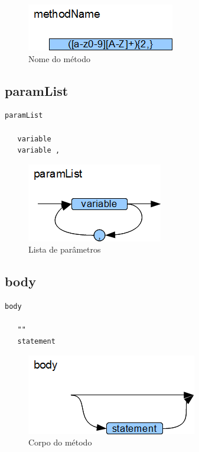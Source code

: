\begin{figure}[h!]
 \centering
 \includegraphics{capitulo09/methodName.png}
 \caption{Nome do método}
\end{figure}
\subsection{paramList}

\begin{lstlisting}
paramList

   variable
   variable ,

\end{lstlisting}

\begin{figure}[h!]
 \centering
 \includegraphics{capitulo09/paramList.png}
 \caption{Lista de parâmetros}
\end{figure}
\subsection{body}

\begin{lstlisting}
body

   ""
   statement

\end{lstlisting}

\begin{figure}[h!]
 \centering
 \includegraphics{capitulo09/body.png}
 \caption{Corpo do método}
\end{figure}
